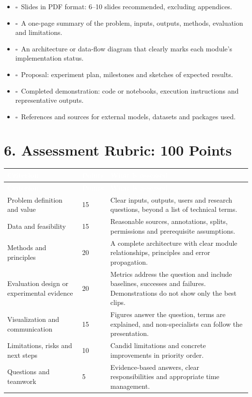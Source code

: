 \documentclass[11pt,a4paper]{article}
\newcommand{\checkbox}{\(\square\)}
\begin{document}
\begin{itemize}[leftmargin=1.6em,itemsep=4pt]
  \item \checkbox\ Slides in PDF format: 6--10 slides recommended, excluding appendices.
  \item \checkbox\ A one-page summary of the problem, inputs, outputs, methods, evaluation and limitations.
  \item \checkbox\ An architecture or data-flow diagram that clearly marks each module's implementation status.
  \item \checkbox\ Proposal: experiment plan, milestones and sketches of expected results.
  \item \checkbox\ Completed demonstration: code or notebooks, execution instructions and representative outputs.
  \item \checkbox\ References and sources for external models, datasets and packages used.
\end{itemize}

\section{6. Assessment Rubric: 100 Points}

\begin{xltabular}{\textwidth}{|Y|C{1.5cm}|Y|}\hline
{}\textcolor{white}{\textbf{Criterion}} & \textcolor{white}{\textbf{Points}} & \textcolor{white}{\textbf{What is assessed}} \\ \hline
\endfirsthead
\hline
{}\textcolor{white}{\textbf{Criterion}} & \textcolor{white}{\textbf{Points}} & \textcolor{white}{\textbf{What is assessed}} \\ \hline
\endhead
Problem definition and value & 15 & Clear inputs, outputs, users and research questions, beyond a list of technical terms. \\ \hline
Data and feasibility & 15 & Reasonable sources, annotations, splits, permissions and prerequisite assumptions. \\ \hline
Methods and principles & 20 & A complete architecture with clear module relationships, principles and error propagation. \\ \hline
Evaluation design or experimental evidence & 20 & Metrics address the question and include baselines, successes and failures. Demonstrations do not show only the best clips. \\ \hline
Visualization and communication & 15 & Figures answer the question, terms are explained, and non-specialists can follow the presentation. \\ \hline
Limitations, risks and next steps & 10 & Candid limitations and concrete improvements in priority order. \\ \hline
Questions and teamwork & 5 & Evidence-based answers, clear responsibilities and appropriate time management. \\ \hline
\end{xltabular}
\end{document}
